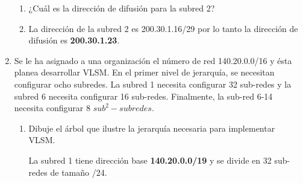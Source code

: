 \begin{enumerate}
\begin{enumerate}
        \item ¿Cu\'al es la direcci\'on de difusi\'on para la subred 2?
        \item[] La direcci\'on de la subred 2 es 200.30.1.16/29 por lo tanto la direcci\'on de difusi\'on es
        \textbf{200.30.1.23}.
    \end{enumerate}
\newpage
    \item Se le ha asignado a una organizaci\'on el n\'umero de red 140.20.0.0/16 y \'esta planea desarrollar VLSM. En el primer
    nivel de jerarqu\'ia, se necesitan configurar ocho subredes. La subred 1 necesita configurar 32 sub-redes y la subred 6
    necesita configurar 16 sub-redes. Finalmente, la sub-red 6-14 necesita configurar 8 \(sub^2-subredes\).
    \begin{enumerate}
        \item Dibuje el \'arbol que ilustre la jerarqu\'ia necesaria para implementar VLSM.
        \begin{figure}[H]
            \centering
            \begin{minipage}{11cm}
            \end{minipage}
        \end{figure}
        \noindent La subred 1 tiene direcci\'on base \textbf{140.20.0.0/19} y se divide en 32 sub-redes de tamaño /24.

\end{enumerate}
\end{enumerate}
